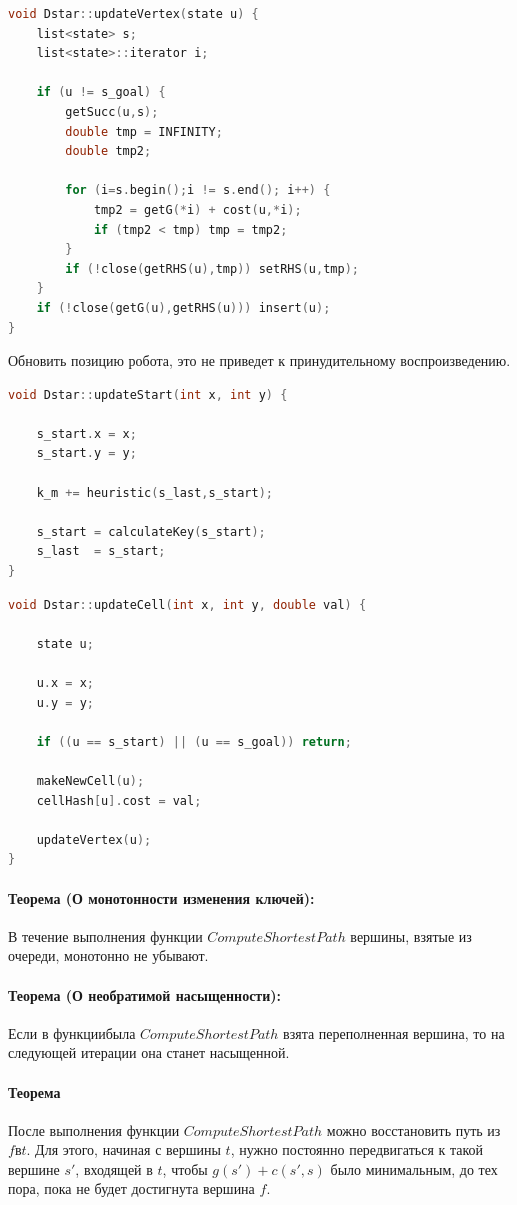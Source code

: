 \documentclass[12pt]{article}
\begin{document}
\begin{lstlisting}[language=C,style=C]
void Dstar::updateVertex(state u) {
    list<state> s;
    list<state>::iterator i;

    if (u != s_goal) {
        getSucc(u,s);
        double tmp = INFINITY;
        double tmp2;

        for (i=s.begin();i != s.end(); i++) {
            tmp2 = getG(*i) + cost(u,*i);
            if (tmp2 < tmp) tmp = tmp2;
        }
        if (!close(getRHS(u),tmp)) setRHS(u,tmp);
    }
    if (!close(getG(u),getRHS(u))) insert(u);
}
\end{lstlisting}
Обновить позицию робота, это не приведет к принудительному воспроизведению.
\begin{lstlisting}[language=C,style=C]
void Dstar::updateStart(int x, int y) {

    s_start.x = x;
    s_start.y = y;

    k_m += heuristic(s_last,s_start);

    s_start = calculateKey(s_start);
    s_last  = s_start;
}
\end{lstlisting}


\begin{lstlisting}[language=C,style=C]
void Dstar::updateCell(int x, int y, double val) {

    state u;

    u.x = x;
    u.y = y;

    if ((u == s_start) || (u == s_goal)) return;

    makeNewCell(u);
    cellHash[u].cost = val;

    updateVertex(u);
}
\end{lstlisting}

\paragraph{Теорема (О монотонности изменения ключей):}
В течение выполнения функции $ComputeShortestPath$ вершины, взятые из очереди, монотонно не убывают.
\paragraph{Теорема (О необратимой насыщенности):}
Если в функциибыла $ComputeShortestPath$ взята переполненная вершина, то на следующей итерации она станет насыщенной.
\paragraph{Теорема}
После выполнения функции $ComputeShortestPath$ можно восстановить путь из $f в t$. Для этого, начиная с вершины $t$, нужно постоянно передвигаться к такой вершине $s′$, входящей в $t$, чтобы $g(s′)+c(s′,s)$ было минимальным, до тех пора, пока не будет достигнута вершина $f$.
\end{document}
